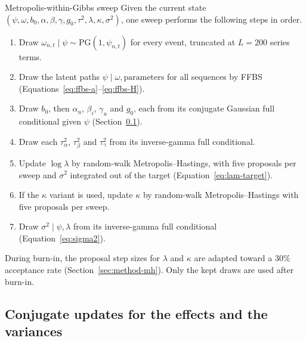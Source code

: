 \begin{algobox}{Metropolis-within-Gibbs sweep}\label{alg:sweep}
  Given the current state $(\psi, \omega, b_0, \alpha, \beta, \gamma, g_0, \tau^2, \lambda, \kappa, \sigma^2)$,
  one sweep performs the following steps in order.
  \begin{enumerate}[leftmargin=2em, itemsep=2pt]
    \item Draw $\omega_{n,t} \mid \psi \sim \mathrm{PG}(1, \psi_{n,t})$ for every event, truncated at $L = 200$ series terms.
    \item Draw the latent paths $\psi \mid \omega, \text{parameters}$ for all sequences by FFBS
      (Equations~\eqref{eq:ffbs-a}--\eqref{eq:ffbs-H}).
    \item Draw $b_0$, then $\alpha_u$, $\beta_i$, $\gamma_u$ and $g_0$, each from its conjugate
      Gaussian full conditional given $\psi$ (Section~\ref{sec:method-effects}).
    \item Draw each $\tau^2_\alpha$, $\tau^2_\beta$ and $\tau^2_\gamma$ from its inverse-gamma
      full conditional.
    \item Update $\log\lambda$ by random-walk Metropolis--Hastings, with five proposals per sweep and
      $\sigma^2$ integrated out of the target (Equation~\eqref{eq:lam-target}).
    \item If the $\kappa$ variant is used, update $\kappa$ by random-walk Metropolis--Hastings with
      five proposals per sweep.
    \item Draw $\sigma^2 \mid \psi, \lambda$ from its inverse-gamma full conditional
      (Equation~\eqref{eq:sigma2}).
  \end{enumerate}
  During burn-in, the proposal step sizes for $\lambda$ and $\kappa$ are adapted toward a
  $30\%$ acceptance rate (Section~\ref{sec:method-mh}). Only the kept draws are used after burn-in.
\end{algobox}

\subsection{Conjugate updates for the effects and the variances}
\label{sec:method-effects}

